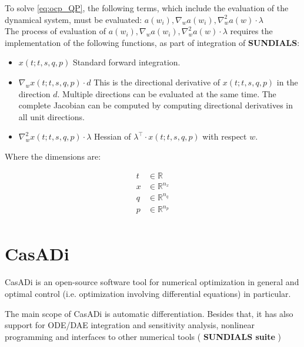 \documentclass[12pt, letterpaper]{article}
\begin{document}
To solve \ref{eq:ocp_QP}, the following terms, which include the evaluation of the dynamical system, must be evaluated: $ a(w_i), \nabla_w a(w_i), \nabla_w^2 a(w)\cdot \lambda $
\\

The process of evaluation of \boldmath$ a(w_i), \nabla_w a(w_i), \nabla_w^2 a(w) \cdot \lambda $ requires the implementation of the following functions, as part of integration of \textbf{SUNDIALS}:

\begin{itemize}
  \item \boldmath$x(t;t,s,q,p)$
        Standard forward integration.
  \item \boldmath$\nabla_{w} x(t;t,s,q,p)\cdot d$
        This is the directional derivative of $x(t;t,s,q,p)$ in the direction $d$. Multiple directions can be evaluated at the same time. The complete Jacobian can be computed by computing directional derivatives in all unit directions.
  \item \boldmath$\nabla^2_{w} x(t;t,s,q,p) \cdot \lambda$
        Hessian of $\lambda^\top \cdot x(t;t,s,q,p)$ with respect $w$.
\end{itemize}

%  

Where the dimensions are:

\begin{subequations}
\begin{align}
  t &\in \mathbb{R}                \\
  x &\in \mathbb{R}^{n_x}         \\
  q &\in \mathbb{R}^{n_q}         \\
  p &\in \mathbb{R}^{n_p}         \\
\end{align}
\end{subequations}


\section{CasADi}
\label{CasADi_section}

CasADi is an open-source software tool for numerical optimization in general and optimal control (i.e. optimization involving differential equations) in particular. \cite{Andersson2018}

The main scope of CasADi is automatic differentiation. Besides that, it has also support for ODE/DAE integration and sensitivity analysis, nonlinear programming and interfaces to other numerical tools ( \textbf{SUNDIALS suite} )
\end{document}

